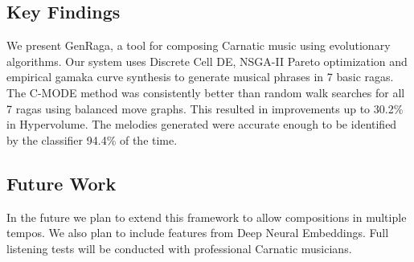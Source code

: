 \documentclass[conference,letterpaper]{IEEEtran}
\newcounter{algorithm}
\begin{document}
\subsection{Key Findings}
We present GenRaga, a tool for composing Carnatic music using evolutionary algorithms. Our system uses Discrete Cell DE, NSGA-II Pareto optimization and empirical gamaka curve synthesis to generate musical phrases in 7 basic ragas. The C-MODE method was consistently better than random walk searches for all 7 ragas using balanced move graphs. This resulted in improvements up to 30.2\% in Hypervolume. The melodies generated were accurate enough to be identified by the classifier 94.4\% of the time.

\subsection{Future Work}
In the future we plan to extend this framework to allow compositions in multiple tempos. We also plan to include features from Deep Neural Embeddings. Full listening tests will be conducted with professional Carnatic musicians.
\end{document}
